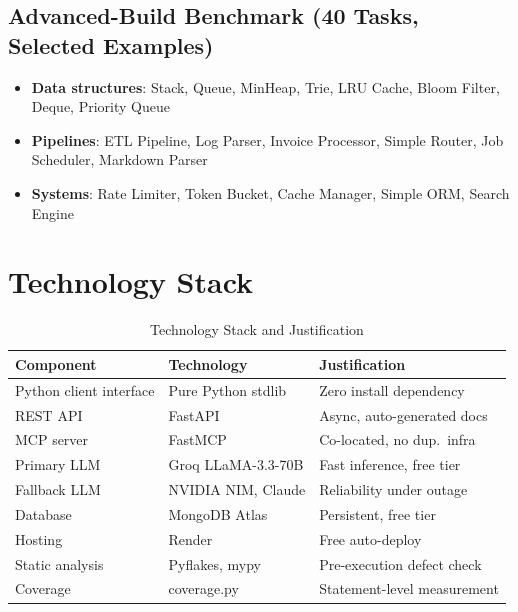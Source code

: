 \documentclass[conference]{IEEEtran}
\begin{document}
\subsection{Advanced-Build Benchmark (40 Tasks, Selected Examples)}

\begin{itemize}
  \item \textbf{Data structures}: Stack, Queue, MinHeap, Trie, LRU Cache,
        Bloom Filter, Deque, Priority Queue
  \item \textbf{Pipelines}: ETL Pipeline, Log Parser, Invoice Processor,
        Simple Router, Job Scheduler, Markdown Parser
  \item \textbf{Systems}: Rate Limiter, Token Bucket, Cache Manager,
        Simple ORM, Search Engine
\end{itemize}

\appendix
\section{Technology Stack}
\label{appendix:stack}

\begin{table}[htbp]
  \centering
  \caption{Technology Stack and Justification}
  \label{tab:stack}
  \renewcommand{\arraystretch}{1.2}
  \begin{tabular}{lll}
    \toprule
    \textbf{Component}  & \textbf{Technology}    & \textbf{Justification} \\
    \midrule
    Python client interface & Pure Python stdlib  & Zero install dependency \\
    REST API                & FastAPI             & Async, auto-generated docs \\
    MCP server              & FastMCP             & Co-located, no dup.\ infra \\
    Primary LLM             & Groq LLaMA-3.3-70B  & Fast inference, free tier \\
    Fallback LLM            & NVIDIA NIM, Claude  & Reliability under outage \\
    Database                & MongoDB Atlas       & Persistent, free tier \\
    Hosting                 & Render              & Free auto-deploy \\
    Static analysis         & Pyflakes, mypy      & Pre-execution defect check \\
    Coverage                & coverage.py         & Statement-level measurement \\
    \bottomrule
  \end{tabular}
\end{table}
\end{document}
